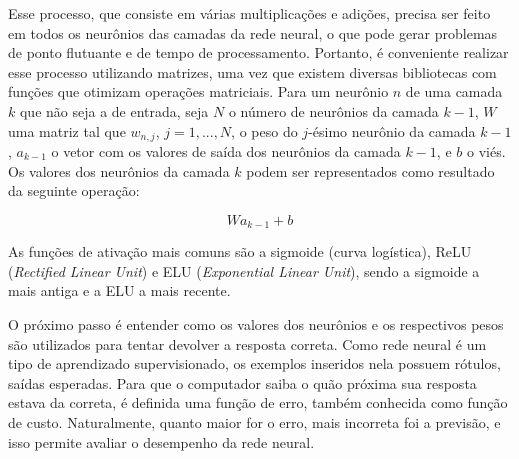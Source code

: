 Esse processo, que consiste em várias multiplicações e adições, precisa ser feito em todos os neurônios das camadas da rede neural, o que pode gerar problemas de ponto flutuante e de tempo de processamento.
Portanto, é conveniente realizar esse processo utilizando matrizes, uma vez que existem diversas bibliotecas com funções que otimizam operações matriciais.
Para um neurônio $n$ de uma camada $k$ que não seja a de entrada, seja $N$ o número de neurônios da camada $k-1$, $W$ uma matriz tal que $w_{n, j}$, $j = 1, ..., N$, o peso do $j$-ésimo neurônio da camada $k-1$, $a_{k-1}$ o vetor com os valores de saída dos neurônios da camada $k-1$, e $b$ o viés.
Os valores dos neurônios da camada $k$ podem ser representados como resultado da seguinte operação:

\begin{equation} \label{eq:nn02}
Wa_{k-1} + b
\end{equation}

As funções de ativação mais comuns são a sigmoide (curva logística), ReLU (\textit{Rectified Linear Unit}) e ELU (\textit{Exponential Linear Unit}), sendo a sigmoide a mais antiga e a ELU a mais recente.

O próximo passo é entender como os valores dos neurônios e os respectivos pesos são utilizados para tentar devolver a resposta correta.
Como rede neural é um tipo de aprendizado supervisionado, os exemplos inseridos nela possuem rótulos, saídas esperadas.
Para que o computador saiba o quão próxima sua resposta estava da correta, é definida uma função de erro, também conhecida como função de custo.
Naturalmente, quanto maior for o erro, mais incorreta foi a previsão, e isso permite avaliar o desempenho da rede neural.

